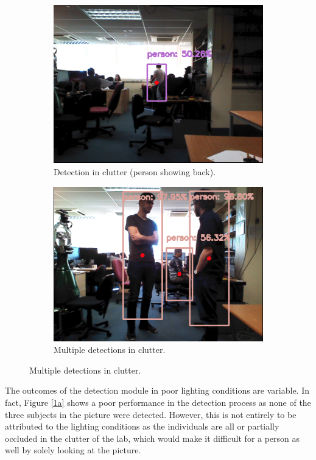 \begin{figure}[H]
\begin{subfigure}{.5\textwidth}
        \includegraphics[width=.9\linewidth]{images/chapter6_clutter_light_detection_back.png}
        \caption{Detection in clutter (person showing back).}
        \label{1c}
	\end{subfigure}
    \begin{subfigure}{.5\textwidth}
        \centering
        \includegraphics[width=.9\linewidth]{images/chapter6_clutter_standing.png}
        \caption{Multiple detections in clutter.}
        \label{1d}
	\end{subfigure}
\end{figure}

The outcomes of the detection module in poor lighting conditions are variable. In fact, Figure \ref{1a} shows a poor performance in the detection process as none of the three subjects in the picture were detected. However, this is not entirely to be attributed to the lighting conditions as the individuals are all or partially occluded in the clutter of the lab, which would make it difficult for a person as well by solely looking at the picture.

